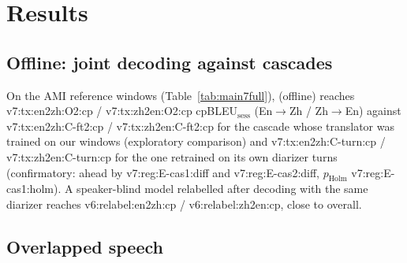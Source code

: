 \section{Results}
\label{sec:results}

\subsection{Offline: joint decoding against cascades}
\label{sec:res-offline}

On the AMI reference windows (Table~\ref{tab:main7full}), \sys{} (offline) reaches
\num{v7:tx:en2zh:O2:cp} / \num{v7:tx:zh2en:O2:cp} cpBLEU$_\text{sess}$ (En$\rightarrow$Zh / Zh$\rightarrow$En) against
\num{v7:tx:en2zh:C-ft2:cp} / \num{v7:tx:zh2en:C-ft2:cp} for the cascade whose translator was trained on our windows
(exploratory comparison) and \num{v7:tx:en2zh:C-turn:cp} / \num{v7:tx:zh2en:C-turn:cp} for the one retrained on its own
diarizer turns (confirmatory: \sys{} ahead by \num{v7:reg:E-cas1:diff} and \num{v7:reg:E-cas2:diff}, $p_\text{Holm}$
\num{v7:reg:E-cas1:holm}). A speaker-blind model relabelled after decoding with the same diarizer reaches
\num{v6:relabel:en2zh:cp} / \num{v6:relabel:zh2en:cp}, close to \sys{} overall.

\subsection{Overlapped speech}
\label{sec:res-overlap}



